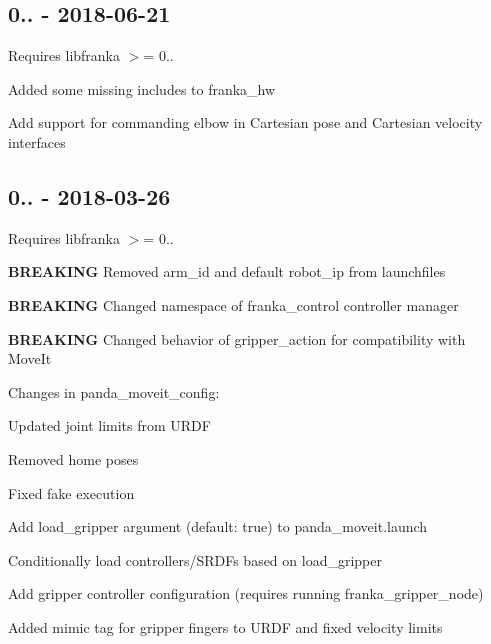 \subsection*{0.. -\/ 2018-\/06-\/21}

Requires {\ttfamily libfranka} $>$= 0..


\begin{DoxyItemize}
\item Added some missing includes to {\ttfamily franka\+\_\+hw}
\item Add support for commanding elbow in Cartesian pose and Cartesian velocity interfaces
\end{DoxyItemize}

\subsection*{0.. -\/ 2018-\/03-\/26}

Requires {\ttfamily libfranka} $>$= 0..


\begin{DoxyItemize}
\item {\bfseries B\+R\+E\+A\+K\+I\+NG} Removed {\ttfamily arm\+\_\+id} and default {\ttfamily robot\+\_\+ip} from launchfiles
\item {\bfseries B\+R\+E\+A\+K\+I\+NG} Changed namespace of {\ttfamily franka\+\_\+control} controller manager
\item {\bfseries B\+R\+E\+A\+K\+I\+NG} Changed behavior of {\ttfamily gripper\+\_\+action} for compatibility with Move\+It
\item Changes in {\ttfamily panda\+\_\+moveit\+\_\+config}\+:
\begin{DoxyItemize}
\item Updated joint limits from U\+R\+DF
\item Removed {\ttfamily home} poses
\item Fixed fake execution
\item Add {\ttfamily load\+\_\+gripper} argument (default\+: {\ttfamily true}) to {\ttfamily panda\+\_\+moveit.\+launch}
\item Conditionally load controllers/\+S\+R\+D\+Fs based on {\ttfamily load\+\_\+gripper}
\item Add gripper controller configuration (requires running {\ttfamily franka\+\_\+gripper\+\_\+node})
\end{DoxyItemize}
\item Added {\ttfamily mimic} tag for gripper fingers to U\+R\+DF and fixed velocity limits
\end{DoxyItemize}

